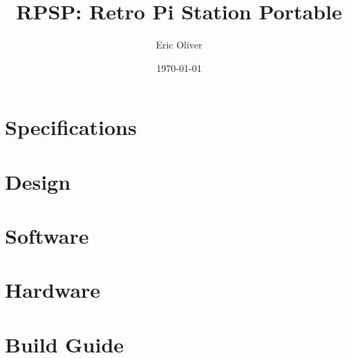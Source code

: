\documentclass[12pt]{report}
\title{RPSP: Retro Pi Station Portable}
\author{Eric Oliver}
\date{\today}
\begin{document}
\maketitle

\tableofcontents

\chapter{Specifications}

\chapter{Design}

\chapter{Software}

\chapter{Hardware}

\chapter{Build Guide}

\end{document}
